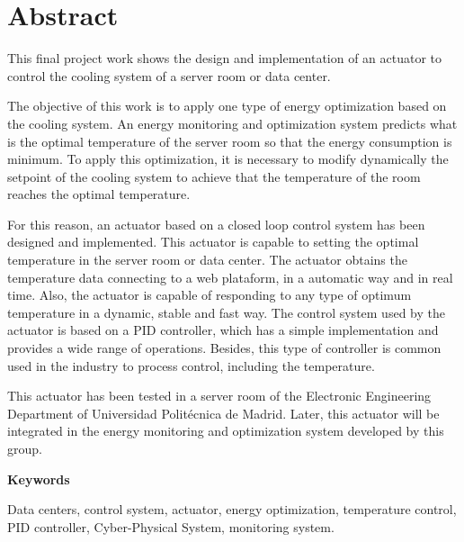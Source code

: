 \cleardoublepage
\chapter*{Abstract} %
\markboth{}{} %

	This final project work shows the design and implementation of an actuator to control the cooling system of a server room or data center.

	The objective of this work is to apply one type of energy optimization based on the cooling system. An energy monitoring and optimization system predicts what is the optimal temperature of the server room so that the energy consumption is minimum. To apply this optimization, it is necessary to modify dynamically the setpoint of the cooling system to achieve that the temperature of the room reaches the optimal temperature.

	For this reason, an actuator based on a closed loop control system has been designed and implemented. This actuator is capable to setting the optimal temperature in the server room or data center. The actuator obtains the temperature data connecting to a web plataform, in a automatic way and in real time. Also, the actuator is capable of responding to any type of optimum temperature in a dynamic, stable and fast way. The control system used by the actuator is based on a PID controller, which has a simple implementation and provides a wide range of operations. Besides, this type of controller is common used in the industry to process control, including the temperature.

	This actuator has been tested in a server room of the Electronic Engineering Department of Universidad Politécnica de Madrid. Later, this actuator will be integrated in the energy monitoring and optimization system developed by this group.

\noindent\textbf{Keywords}

\noindent Data centers, control system, actuator, energy optimization, temperature control, PID controller, Cyber-Physical System, monitoring system.



